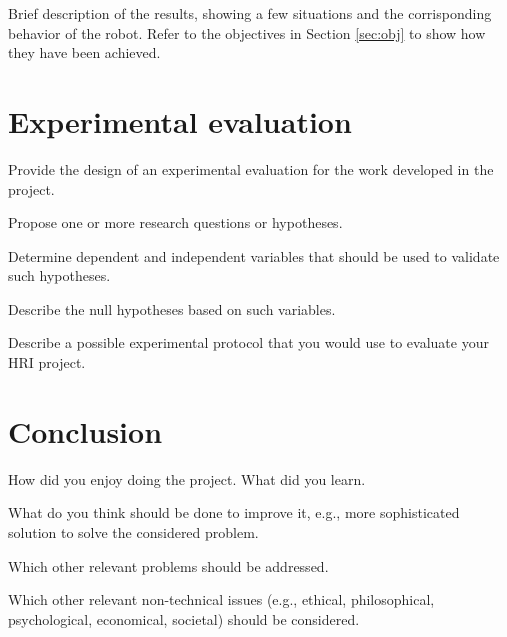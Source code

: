 \documentclass{article}
\begin{document}
Brief description of the results, showing  a few situations and the corrisponding behavior of the robot. Refer to the objectives in Section \ref{sec:obj} to show how they have been achieved.



\section{Experimental evaluation}

Provide the design of an experimental evaluation for the work developed in the project.

Propose one or more research questions or hypotheses. 

Determine dependent and independent variables that should be used to validate such hypotheses.

Describe the null hypotheses based on such variables.

Describe a possible experimental protocol that you would use to evaluate your HRI project.


\section{Conclusion}

How did you enjoy doing the project.
What did you learn. 

What do you think should be done to improve it, e.g., more sophisticated solution to solve the considered problem.

Which other relevant problems should be addressed.

Which other relevant non-technical issues (e.g., ethical, philosophical, psychological, economical, societal)
should be considered.



\end{document}
